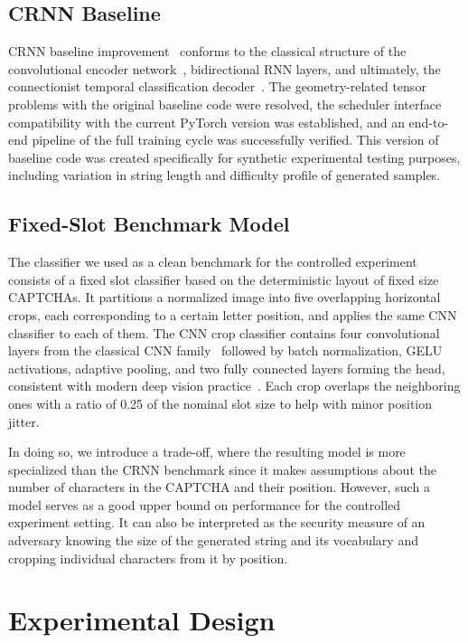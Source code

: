 \documentclass[pdflatex,sn-mathphys-num,iicol]{sn-jnl}
\begin{document}
\subsection{CRNN Baseline}

CRNN baseline improvement~\cite{shi2017crnn} conforms to the classical structure of the convolutional encoder network~\cite{lecun1998gradient}, bidirectional RNN layers, and ultimately, the connectionist temporal classification decoder~\cite{graves2006ctc}. The geometry-related tensor problems with the original baseline code were resolved, the scheduler interface compatibility with the current PyTorch version was established, and an end-to-end pipeline of the full training cycle was successfully verified. This version of baseline code was created specifically for synthetic experimental testing purposes, including variation in string length and difficulty profile of generated samples.

\subsection{Fixed-Slot Benchmark Model}

The classifier we used as a clean benchmark for the controlled experiment consists of a fixed slot classifier based on the deterministic layout of fixed size CAPTCHAs. It partitions a normalized image into five overlapping horizontal crops, each corresponding to a certain letter position, and applies the same CNN classifier to each of them. The CNN crop classifier contains four convolutional layers from the classical CNN family~\cite{lecun1998gradient} followed by batch normalization, GELU activations, adaptive pooling, and two fully connected layers forming the head, consistent with modern deep vision practice~\cite{he2016deep}. Each crop overlaps the neighboring ones with a ratio of 0.25 of the nominal slot size to help with minor position jitter.

In doing so, we introduce a trade-off, where the resulting model is more specialized than the CRNN benchmark since it makes assumptions about the number of characters in the CAPTCHA and their position. However, such a model serves as a good upper bound on performance for the controlled experiment setting. It can also be interpreted as the security measure of an adversary knowing the size of the generated string and its vocabulary and cropping individual characters from it by position.

\section{Experimental Design}
\end{document}

